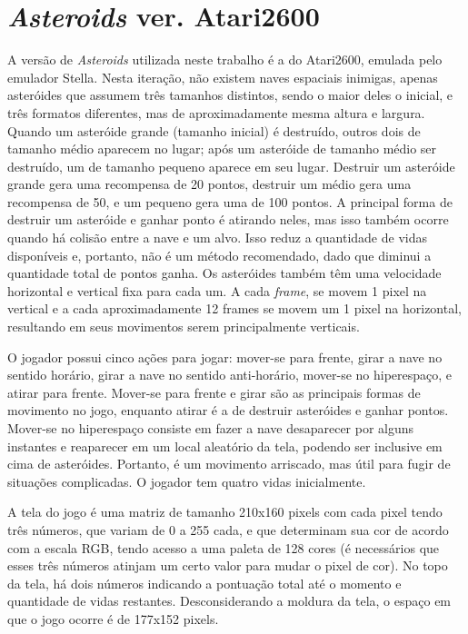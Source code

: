 \section{\textit{Asteroids} ver. Atari2600}
\label{sec:aa2600}

A versão de \textit{Asteroids} utilizada neste trabalho é a do Atari2600, emulada pelo emulador Stella.
Nesta iteração, não existem naves espaciais inimigas, apenas asteróides que assumem três tamanhos distintos, sendo o maior deles o inicial, e três formatos diferentes, mas de aproximadamente mesma altura e largura.
Quando um asteróide grande (tamanho inicial) é destruído, outros dois de tamanho médio aparecem no lugar; após um asteróide de tamanho médio ser destruído, um de tamanho pequeno aparece em seu lugar.
Destruir um asteróide grande gera uma recompensa de 20 pontos, destruir um médio gera uma recompensa de 50, e um pequeno gera uma de 100 pontos.
A principal forma de destruir um asteróide e ganhar ponto é atirando neles, mas isso também ocorre quando há colisão entre a nave e um alvo.
Isso reduz a quantidade de vidas disponíveis e, portanto, não é um método recomendado, dado que diminui a quantidade total de pontos ganha.
Os asteróides também têm uma velocidade horizontal e vertical fixa para cada um.
A cada \textit{frame}, se movem 1 pixel na vertical e a cada aproximadamente 12 frames se movem um 1 pixel na horizontal, resultando em seus movimentos serem principalmente verticais.

O jogador possui cinco ações para jogar: mover-se para frente, girar a nave no sentido horário, girar a nave no sentido anti-horário, mover-se no hiperespaço, e atirar para frente.
Mover-se para frente e girar são as principais formas de movimento no jogo, enquanto atirar é a de destruir asteróides e ganhar pontos.
Mover-se no hiperespaço consiste em fazer a nave desaparecer por alguns instantes e reaparecer em um local aleatório da tela, podendo ser inclusive em cima de asteróides.
Portanto, é um movimento arriscado, mas útil para fugir de situações complicadas.
O jogador tem quatro vidas inicialmente.

A tela do jogo é uma matriz de tamanho 210x160 pixels com cada pixel tendo três números, que variam de 0 a 255 cada, e que determinam sua cor de acordo com a escala RGB, tendo acesso a uma paleta de 128 cores (é necessários que esses três números atinjam um certo valor para mudar o pixel de cor).
No topo da tela, há dois números indicando a pontuação total até o momento e quantidade de vidas restantes.
Desconsiderando a moldura da tela, o espaço em que o jogo ocorre é de 177x152 pixels.

